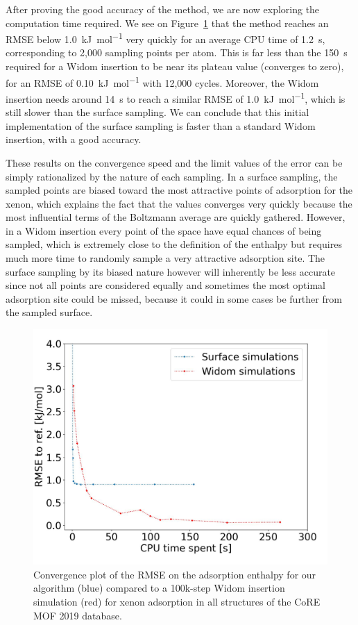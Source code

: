 \documentclass[main]{subfiles}
\begin{document}
After proving the good accuracy of the method, we are now exploring the computation time required. We see on Figure~\ref{fgr:convergence} that the method reaches an RMSE below \SI{1.0}{\kilo\joule\per\mole} very quickly for an average CPU time of \SI{1.2}{\second}, corresponding to 2,000 sampling points per atom. This is far less than the \SI{150}{\second} required for a Widom insertion to be near its plateau value (converges to zero), for an RMSE of \SI{0.10}{\kilo\joule\per\mole} with 12,000 cycles. Moreover, the Widom insertion needs around \SI{14}{\second} to reach a similar RMSE of \SI{1.0}{\kilo\joule\per\mole}, which is still slower than the surface sampling. We can conclude that this initial implementation of the surface sampling is faster than a standard Widom insertion, with a good accuracy.

These results on the convergence speed and the limit values of the error can be simply rationalized by the nature of each sampling. In a surface sampling, the sampled points are biased toward the most attractive points of adsorption for the xenon, which explains the fact that the values converges very quickly because the most influential terms of the Boltzmann average are quickly gathered. However, in a Widom insertion every point of the space have equal chances of being sampled, which is extremely close to the definition of the enthalpy but requires much more time to randomly sample a very attractive adsorption site. The surface sampling by its biased nature however will inherently be less accurate since not all points are considered equally and sometimes the most optimal adsorption site could be missed, because it could in some cases be further from the sampled surface. 

\begin{figure}[ht]
  \centering
    \includegraphics[width=0.7\linewidth]{figures/3-fastsim/time_rmse.jpeg}
    \caption{Convergence plot of the RMSE on the adsorption enthalpy for our algorithm (blue) compared to a 100k-step Widom insertion simulation (red) for xenon adsorption in {all} structures of the CoRE MOF 2019 database.}\label{fgr:convergence}
  \end{figure}
  
\end{document}
